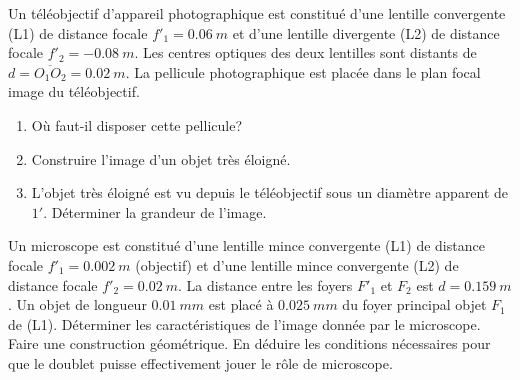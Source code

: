 \begin{exercice}[Téléobjectif]%
Un téléobjectif d'appareil photographique est constitué d'une lentille 
  convergente (L1) de distance focale \(f'_1 = \SI{0,06}{m}\) et d'une lentille 
  divergente (L2) de distance focale \(f'_2 = -\SI{0,08}{m}\). Les centres 
  optiques des deux lentilles sont distants de \(d = \overline{O_1O_2} = 
  \SI{0,02}{m}\). La pellicule photographique est placée dans le plan focal 
  image du téléobjectif.
\begin{enumerate}%
  \item Où faut-il disposer cette pellicule?
  \item Construire l'image d'un objet très éloigné.
  \item L'objet très éloigné est vu depuis le téléobjectif sous un diamètre 
    apparent de \(1'\). Déterminer la grandeur de l'image.
\end{enumerate}%
\end{exercice}%
%
\begin{exercice}[Microscope]%
Un microscope est constitué d'une lentille mince convergente (L1) de distance 
  focale \(f'_1 = \SI{0,002}{m}\) (objectif) et d'une lentille mince 
  convergente (L2) de distance focale \(f'_2 = \SI{0,02}{m}\). La distance 
  entre les foyers \(F'_1\) et \(F_2\) est \(d = \SI{0,159}{m}\). Un objet de 
  longueur \(\SI{0,01}{mm}\) est placé à \(\SI{0,025}{mm}\) du foyer principal 
  objet \(F_1\) de (L1). Déterminer les caractéristiques de l'image donnée par 
  le microscope. Faire une construction géométrique. En déduire les conditions 
  nécessaires pour que le doublet puisse effectivement jouer le rôle de 
  microscope.
\end{exercice}%


